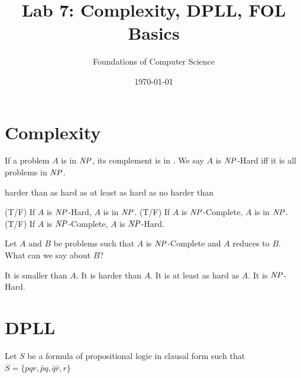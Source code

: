 \documentclass[]{exam}
\title{Lab 7: Complexity, DPLL, FOL Basics}
\author{Foundations of Computer Science}
\date{\today}
\newcommand{\id}[1]{\mbox{\it #1\/}}
\newcommand{\tf}[1][{}]{%
\fillin[#1][0.25in]%
}
\begin{document}
\maketitle
\setlength{\columnseprule}{1pt}
\section*{Complexity}
\begin{questions} 
\question If a problem $A$ is in $\id{NP}$, its complement is in \fillin[CoNP].
\question We say $A$ is $\id{NP}$-Hard iff it is \fillin all problems in $\id{NP}$.
\begin{checkboxes}
\choice harder than
\choice as hard as
\CorrectChoice at least as hard as
\choice no harder than
\end{checkboxes}

\question \tf[F] (T/F) If $A$ is $\id{NP}$-Hard, $A$ is in $\id{NP}$.
\question \tf[T] (T/F) If $A$ is $\id{NP}$-Complete, $A$ is in $\id{NP}$.
\question \tf[T] (T/F) If $A$ is $\id{NP}$-Complete, $A$ is $\id{NP}$-Hard.

\question Let $A$ and $B$ be problems such that $A$ is $\id{NP}$-Complete
and $A$ reduces to $B$. What can we say about $B$?
\begin{checkboxes}
\choice It is smaller than $A$.
\choice It is harder than $A$.
\CorrectChoice It is at least as hard as $A$.
\CorrectChoice It is $\id{NP}$-Hard.
\end{checkboxes}

\section*{DPLL}

\question Let $S$ be a formula of propositional logic in clausal form such that
$S = \{pqr, \bar{p}q, \bar{q}\bar{r}, r \}$\\

\end{questions}
\end{document}

